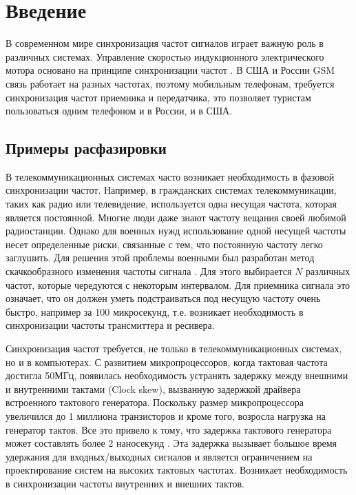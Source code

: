 \documentclass[a4paper,article,14pt]{extarticle}
\begin{document}




 
\tableofcontents



\pagebreak
\section{Введение}
В современном мире синхронизация частот сигналов играет важную роль в различных системах. Управление скоростью индукционного электрического мотора основано на принципе синхронизации частот \cite{mouna}. В США и России GSM связь работает на разных частотах, поэтому мобильным телефонам, требуется синхронизация частот приемника и передатчика, это позволяет туристам пользоваться одним телефоном и в России, и в США.

\subsection{Примеры расфазировки}
В телекоммуникационных системах часто возникает необходимость в фазовой синхронизации частот. Например, в гражданских системах телекоммуникации, таких как радио или телевидение, используется одна несущая частота, которая является постоянной. Многие люди даже знают частоту вещания своей любимой радиостанции. Однако для военных нужд использование одной несущей частоты несет определенные риски, связанные с тем, что постоянную частоту легко заглушить. Для решения этой проблемы военными был разработан метод скачкообразного изменения частоты сигнала \cite{ghulam}. Для этого выбирается $N$ различных частот, которые чередуются с некоторым интервалом. Для приемника сигнала это означает, что он должен уметь подстраиваться под несущую частоту очень быстро, например за 100 микросекунд, т.е. возникает необходимость в синхронизации частоты трансмиттера и ресивера. 

Синхронизация частот требуется, не только в телекоммуникационных системах, но и в компьютерах. С развитием микропроцессоров, когда тактовая частота достигла 50МГц, появилась необходимость устранять задержку между внешними и внутренними тактами (Clock skew), вызванную задержкой драйвера встроенного тактового генератора. Поскольку размер микропроцессора увеличился до 1 миллиона транзисторов и кроме того, возросла нагрузка на генератор тактов. Все это привело к тому, что задержка тактового генератора может составлять более 2 наносекунд \cite{Microprocessors}. Эта задержка вызывает большое время удержания для входных/выходных сигналов и является ограничением на проектирование систем на высоких тактовых частотах. Возникает необходимость в синхронизации частоты внутренних и внешних тактов. 
\end{document}
